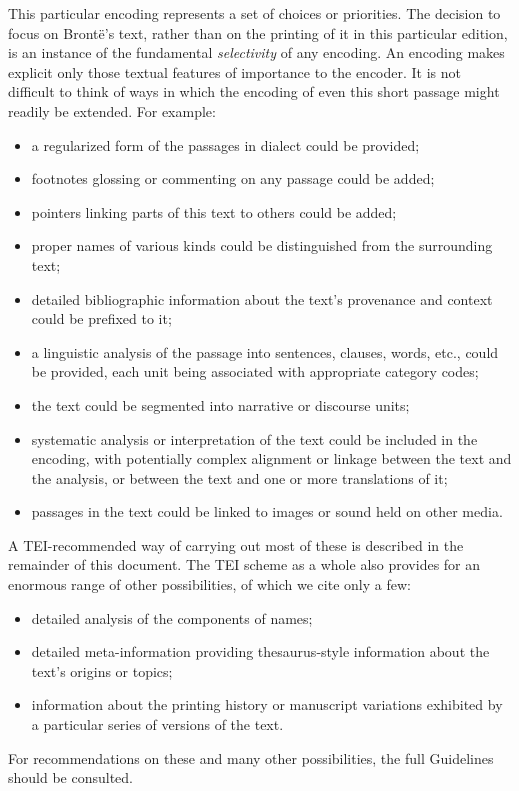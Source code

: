 \documentclass[11pt,twoside]{article}\makeatletter
\begin{document}
This particular encoding represents a set of choices or priorities. The decision to focus on Brontë's text, rather than on the printing of it in this particular edition, is an instance of the fundamental \textit{selectivity} of any encoding. An encoding makes explicit only those textual features of importance to the encoder. It is not difficult to think of ways in which the encoding of even this short passage might readily be extended. For example: \begin{itemize}
\item a regularized form of the passages in dialect could be provided;
\item footnotes glossing or commenting on any passage could be added;
\item pointers linking parts of this text to others could be added;
\item proper names of various kinds could be distinguished from the surrounding text;
\item detailed bibliographic information about the text's provenance and context could be prefixed to it;
\item a linguistic analysis of the passage into sentences, clauses, words, etc., could be provided, each unit being associated with appropriate category codes;
\item the text could be segmented into narrative or discourse units;
\item systematic analysis or interpretation of the text could be included in the encoding, with potentially complex alignment or linkage between the text and the analysis, or between the text and one or more translations of it;
\item passages in the text could be linked to images or sound held on other media.
\end{itemize} \par
A TEI-recommended way of carrying out most of these is described in the remainder of this document. The TEI scheme as a whole also provides for an enormous range of other possibilities, of which we cite only a few: \begin{itemize}
\item detailed analysis of the components of names;
\item detailed meta-information providing thesaurus-style information about the text's origins or topics;
\item information about the printing history or manuscript variations exhibited by a particular series of versions of the text.
\end{itemize}  For recommendations on these and many other possibilities, the full Guidelines should be consulted.
\end{document}
